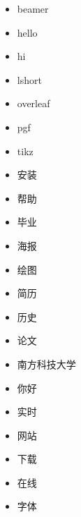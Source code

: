 \documentclass[UTF8,twocolumn]{ctexart}
\begin{document}
\begin{itemize}
  \item beamer
  \item hello
  \item hi
  \item lshort
  \item overleaf
  \item pgf
  \item tikz
  \item 安装
  \item 帮助
  \item 毕业
  \item 海报
  \item 绘图
  \item 简历
  \item 历史
  \item 论文
  \item 南方科技大学
  \item 你好
  \item 实时
  \item 网站
  \item 下载
  \item 在线
  \item 字体
\end{itemize}
\end{document}
